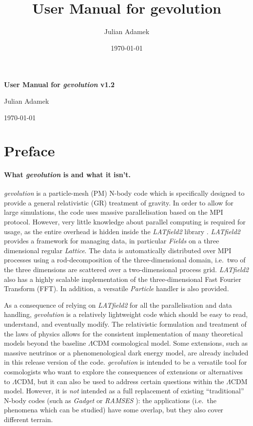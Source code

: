 \documentclass[a4paper,10pt]{article}
\title{User Manual for gevolution}
\author{Julian Adamek}
\date{\today}
\begin{document}
\centerline{\textbf{\huge User Manual for \textit{gevolution} v1.2}}
\vspace{1cm}
\centerline{\large Julian Adamek}
\medskip
\centerline{\today}

\tableofcontents

\section{Preface}

\paragraph{What \textit{gevolution} is and what it isn't.} \textit{gevolution} is a particle-mesh (PM) N-body code which is
specifically designed to provide a general relativistic (GR) treatment of gravity. In order to allow for large simulations, the code uses
massive parallelisation based on the MPI protocol. However, very little knowledge about parallel computing is required for usage, as the
entire overhead is hidden inside the \textit{LATfield2} library \cite{David:2015eya}. \textit{LATfield2} provides a framework for managing
data, in particular
\textit{Fields} on a three dimensional regular \textit{Lattice}. The data is automatically distributed over MPI processes using a
rod-decomposition of the three-dimensional domain, i.e.\ two of the three dimensions are scattered over a two-dimensional process grid.
\textit{LATfield2} also has a highly scalable implementation of the three-dimensional Fast Fourier Transform (FFT). In addition, a
versatile \textit{Particle} handler is also provided.

As a consequence of relying on \textit{LATfield2} for all the parallelisation and data handling, \textit{gevolution} is a relatively
lightweight code which should be easy to read, understand, and eventually modify. The relativistic formulation and treatment of the laws
of physics allows for the consistent implementation of many theoretical models beyond the baseline $\mathsf{\Lambda}$CDM cosmological
model. Some extensions, such as massive neutrinos or a phenomenological dark energy model, are already included in this release version of
the code. \textit{gevolution} is intended to be a versatile tool for cosmologists who want
to explore the consequences of extensions or alternatives to $\mathsf{\Lambda}$CDM, but it can also be used to address certain questions
within the $\mathsf{\Lambda}$CDM model. However, it is \textit{not} intended as a full replacement of existing ``traditional'' N-body codes
(such as \textit{Gadget} \cite{Springel:2000yr,Springel:2005mi} or \textit{RAMSES} \cite{Teyssier:2001cp}): the applications (i.e.\ the
phenomena which can be studied) have some overlap, but they also cover different terrain.
\end{document}
